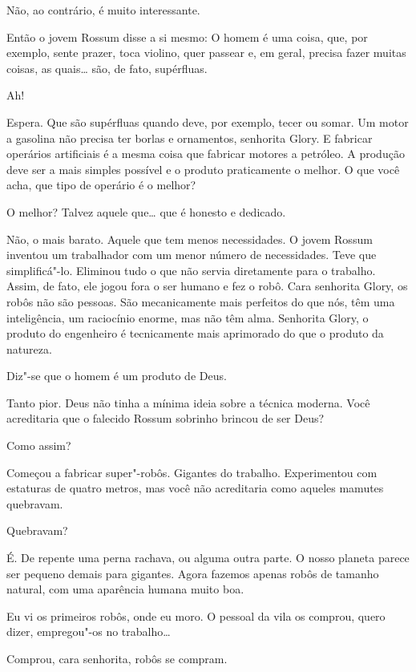  Não, ao contrário, é muito interessante.

 Então o jovem Rossum disse a si mesmo: O homem é uma coisa, que, por
exemplo, sente prazer, toca violino, quer passear e, em geral, precisa fazer
muitas coisas, as quais\ldots{} são, de fato, supérfluas.

 Ah!

 Espera. Que são supérfluas quando deve, por exemplo, tecer ou somar. Um
motor a gasolina não precisa ter borlas e ornamentos, senhorita Glory. E
fabricar operários artificiais é a mesma coisa que fabricar motores a petróleo.
A produção deve ser a mais simples possível e o produto praticamente o melhor. O
que você acha, que tipo de operário é o melhor?

 O melhor? Talvez aquele que\ldots{} que é honesto e dedicado.

 Não, o mais barato. Aquele que tem menos necessidades. O jovem Rossum
inventou um trabalhador com um menor número de necessidades. Teve que
simplificá"-lo. Eliminou tudo o que não servia diretamente para o trabalho. Assim,
de fato, ele jogou fora o ser humano e fez o robô. Cara senhorita Glory, os
robôs não são pessoas. São mecanicamente mais perfeitos do que nós, têm uma
inteligência, um raciocínio enorme, mas não têm alma. Senhorita Glory, o
produto do engenheiro é tecnicamente mais aprimorado do que o produto da
natureza.

 Diz"-se que o homem é um produto de Deus.

 Tanto pior. Deus não tinha a mínima ideia sobre a técnica moderna. Você
acreditaria que o falecido Rossum sobrinho brincou de ser Deus?

 Como assim?

 Começou a fabricar super"-robôs. Gigantes do trabalho. Experimentou com
estaturas de quatro metros, mas você não acreditaria como aqueles mamutes
quebravam.

 Quebravam?

 É. De repente uma perna rachava, ou alguma outra parte. O nosso planeta
parece ser pequeno demais para gigantes. Agora fazemos apenas robôs de tamanho
natural, com uma aparência humana muito boa.

 Eu vi os primeiros robôs, onde eu moro. O pessoal da vila os comprou,
quero dizer, empregou"-os no trabalho\ldots{}

 Comprou, cara senhorita, robôs se compram.

